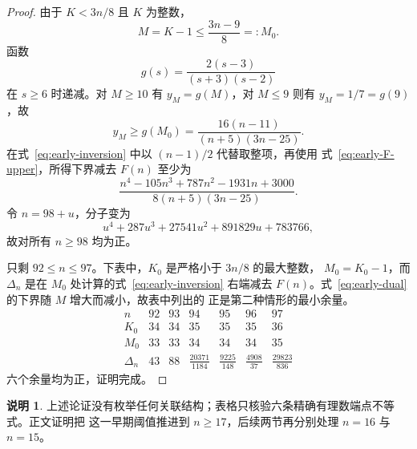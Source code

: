 \documentclass[11pt,a4paper]{ctexart}
\theoremstyle{definition}
\newtheorem{remark}[theorem]{说明}
\begin{document}
\begin{proof}
由于 $K<3n/8$ 且 $K$ 为整数，
\[
 M=K-1\le\frac{3n-9}{8}=:M_0.
\]
函数
\[
 g(s)=\frac{2(s-3)}{(s+3)(s-2)}
\]
在 $s\ge6$ 时递减。对 $M\ge10$ 有 $y_M=g(M)$，对 $M\le9$ 则有
$y_M=1/7=g(9)$，故
\[
 y_M\ge g(M_0)=\frac{16(n-11)}{(n+5)(3n-25)}.
\]
在式~\eqref{eq:early-inversion} 中以 $(n-1)/2$ 代替取整项，再使用
式~\eqref{eq:early-F-upper}，所得下界减去 $F(n)$ 至少为
\[
 \frac{n^4-105n^3+787n^2-1931n+3000}
 {8(n+5)(3n-25)}.
\]
令 $n=98+u$，分子变为
\[
 u^4+287u^3+27541u^2+891829u+783766,
\]
故对所有 $n\ge98$ 均为正。

只剩 $92\le n\le97$。下表中，$K_0$ 是严格小于 $3n/8$ 的最大整数，
$M_0=K_0-1$，而 $\Delta_n$ 是在 $M_0$ 处计算的式~\eqref{eq:early-inversion}
右端减去 $F(n)$。式~\eqref{eq:early-dual} 的下界随 $M$ 增大而减小，故表中列出的
正是第二种情形的最小余量。
\[
\begin{array}{c|rrrrrr}
n&92&93&94&95&96&97\\ \hline
K_0&34&34&35&35&35&36\\
M_0&33&33&34&34&34&35\\
\Delta_n&43&88&\frac{20371}{1184}&\frac{9225}{148}&
\frac{4908}{37}&\frac{29823}{836}
\end{array}
\]
六个余量均为正，证明完成。
\end{proof}

\begin{remark}
上述论证没有枚举任何关联结构；表格只核验六条精确有理数端点不等式。正文证明把
这一早期阈值推进到 $n\ge17$，后续两节再分别处理 $n=16$ 与 $n=15$。
\end{remark}
\end{document}
